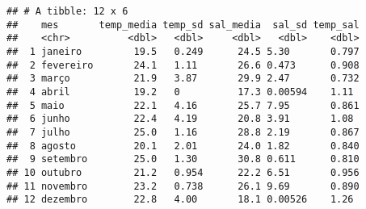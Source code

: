 \documentclass[]{book}
\newenvironment{Shaded}{\begin{snugshade}}{\end{snugshade}}
\newcommand{\DataTypeTok}[1]{\textcolor[rgb]{0.13,0.29,0.53}{#1}}
\newcommand{\KeywordTok}[1]{\textcolor[rgb]{0.13,0.29,0.53}{\textbf{#1}}}
\newcommand{\NormalTok}[1]{#1}
\newcommand{\OperatorTok}[1]{\textcolor[rgb]{0.81,0.36,0.00}{\textbf{#1}}}
\newcommand{\OtherTok}[1]{\textcolor[rgb]{0.56,0.35,0.01}{#1}}
\newcommand{\StringTok}[1]{\textcolor[rgb]{0.31,0.60,0.02}{#1}}
\begin{document}
\begin{Shaded}
\end{Shaded}

\begin{verbatim}
## # A tibble: 12 x 6
##    mes       temp_media temp_sd sal_media  sal_sd temp_sal
##    <chr>          <dbl>   <dbl>     <dbl>   <dbl>    <dbl>
##  1 janeiro         19.5   0.249      24.5 5.30       0.797
##  2 fevereiro       24.1   1.11       26.6 0.473      0.908
##  3 março           21.9   3.87       29.9 2.47       0.732
##  4 abril           19.2   0          17.3 0.00594    1.11 
##  5 maio            22.1   4.16       25.7 7.95       0.861
##  6 junho           22.4   4.19       20.8 3.91       1.08 
##  7 julho           25.0   1.16       28.8 2.19       0.867
##  8 agosto          20.1   2.01       24.0 1.82       0.840
##  9 setembro        25.0   1.30       30.8 0.611      0.810
## 10 outubro         21.2   0.954      22.2 6.51       0.956
## 11 novembro        23.2   0.738      26.1 9.69       0.890
## 12 dezembro        22.8   4.00       18.1 0.00526    1.26
\end{verbatim}
\end{document}
